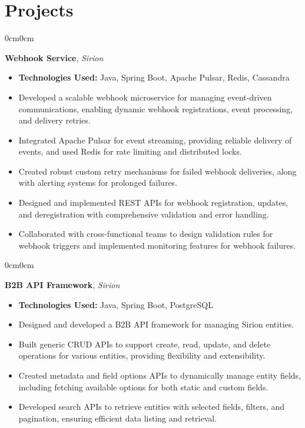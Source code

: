 \documentclass[10pt, letterpaper]{article}
\newenvironment{highlights}{
    \begin{itemize}[topsep=0.05cm, parsep=0.05cm, partopsep=0pt, itemsep=0pt, leftmargin=10pt]
}{
    \end{itemize}
}
\newenvironment{onecolentry}{
    \begin{adjustwidth}{0cm}{0cm}
}{
    \end{adjustwidth}
}
\begin{document}
\section{Projects}

\begin{onecolentry}
    \textbf{Webhook Service}, \textit{Sirion}
    \begin{highlights}
        \item \textbf{Technologies Used:} Java, Spring Boot, Apache Pulsar, Redis, Cassandra
        \item Developed a scalable webhook microservice for managing event-driven communications, enabling dynamic webhook registrations, event processing, and delivery retries.
        \item Integrated Apache Pulsar for event streaming, providing reliable delivery of events, and used Redis for rate limiting and distributed locks.
        \item Created robust custom retry mechanisms for failed webhook deliveries, along with alerting systems for prolonged failures.
        \item Designed and implemented REST APIs for webhook registration, updates, and deregistration with comprehensive validation and error handling.
        \item Collaborated with cross-functional teams to design validation rules for webhook triggers and implemented monitoring features for webhook failures.
    \end{highlights}
\end{onecolentry}

\vspace{0.05cm}

\begin{onecolentry}
    \textbf{B2B API Framework}, \textit{Sirion}
    \begin{highlights}
        \item \textbf{Technologies Used:} Java, Spring Boot, PostgreSQL
        \item Designed and developed a B2B API framework for managing Sirion entities.
        \item Built generic CRUD APIs to support create, read, update, and delete operations for various entities, providing flexibility and extensibility.
        \item Created metadata and field options APIs to dynamically manage entity fields, including fetching available options for both static and custom fields.
        \item Developed search APIs to retrieve entities with selected fields, filters, and pagination, ensuring efficient data listing and retrieval.
    \end{highlights}
\end{onecolentry}
\end{document}
